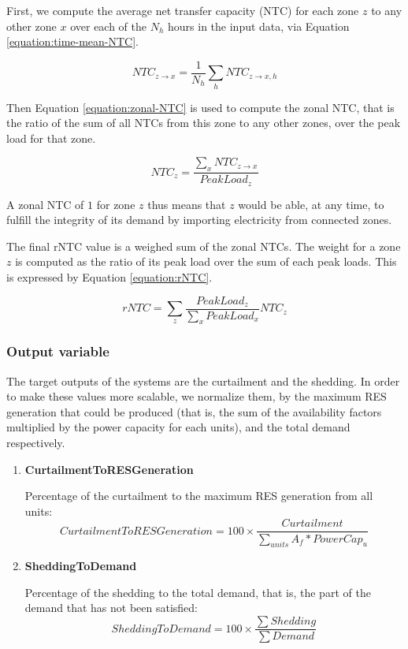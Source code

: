\begin{enumerate}
    First, we compute the average net transfer capacity (NTC) for each zone $z$ to any other zone $x$ over each of the $N_h$ hours in the input data, via Equation \ref{equation:time-mean-NTC}.

    \begin{equation}
        NTC_{z\rightarrow x} = \frac{1}{N_h} \sum_h NTC_{z\rightarrow x,h}
        \label{equation:time-mean-NTC}
    \end{equation}

    Then Equation \ref{equation:zonal-NTC} is used to compute the zonal NTC, that is the ratio of the sum of all NTCs from this zone to any other zones, over the peak load for that zone.

    \begin{equation}
        NTC_z = \frac{\sum_x NTC_{z\rightarrow x}}{PeakLoad_z}
        \label{equation:zonal-NTC}
    \end{equation}

    A zonal NTC of $1$ for zone $z$ thus means that $z$ would be able, at any time, to fulfill the integrity of its demand by importing electricity from connected zones.

    The final rNTC value is a weighed sum of the zonal NTCs. The weight for a zone $z$ is computed as the ratio of its peak load over the sum of each peak loads. This is expressed by Equation \ref{equation:rNTC}.

    \begin{equation}
        rNTC = \sum_z \frac{PeakLoad_z}{\sum_x PeakLoad_x} NTC_z
        \label{equation:rNTC}
    \end{equation}
\end{enumerate}

\subsubsection{Output variable}

The target outputs of the systems are the curtailment and the shedding. In order to make these values more scalable, we normalize them, by the maximum RES generation that could be produced (that is, the sum of the availability factors multiplied by the power capacity for each units), and the total demand respectively.

\begin{enumerate}
    \item \textbf{CurtailmentToRESGeneration}

    Percentage of the curtailment to the maximum RES generation from all units:
    \begin{equation}
        CurtailmentToRESGeneration = 100\times \frac{Curtailment}{\sum_{units} A_f * PowerCap_u}
    \end{equation}
    \item \textbf{SheddingToDemand}

    Percentage of the shedding to the total demand, that is, the part of the demand that has not been satisfied:
    \begin{equation}
        SheddingToDemand = 100\times \frac{\sum Shedding}{\sum Demand}
    \end{equation}
\end{enumerate}


